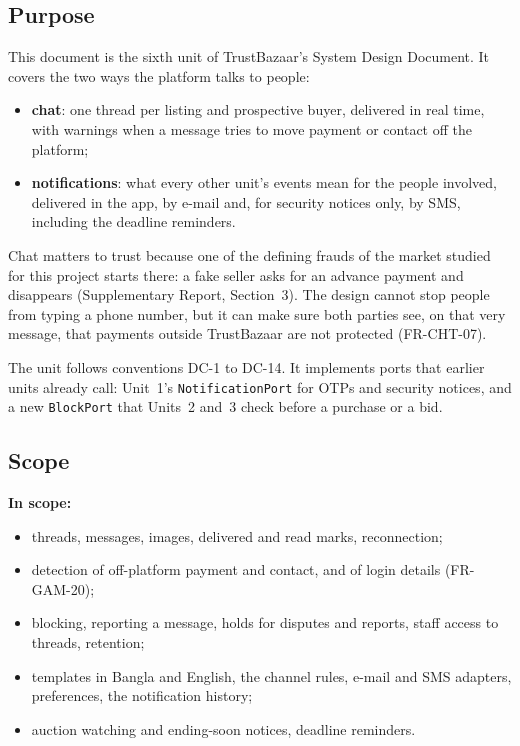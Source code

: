 \documentclass[11pt,a4paper]{article}
\begin{document}
\subsection{Purpose}
This document is the sixth unit of TrustBazaar's System Design Document. It covers the two ways the platform talks to people:
\begin{itemize}[nosep]
  \item \textbf{chat}: one thread per listing and prospective buyer, delivered in real time, with warnings when a message tries to move payment or contact off the platform;
  \item \textbf{notifications}: what every other unit's events mean for the people involved, delivered in the app, by e-mail and, for security notices only, by SMS, including the deadline reminders.
\end{itemize}
Chat matters to trust because one of the defining frauds of the market studied for this project starts there: a fake seller asks for an advance payment and disappears (Supplementary Report, Section~3). The design cannot stop people from typing a phone number, but it can make sure both parties see, on that very message, that payments outside TrustBazaar are not protected (FR-CHT-07).

The unit follows conventions DC-1 to DC-14. It implements ports that earlier units already call: Unit~1's \texttt{NotificationPort} for OTPs and security notices, and a new \texttt{BlockPort} that Units~2 and~3 check before a purchase or a bid.

\subsection{Scope}
\textbf{In scope:}
\begin{itemize}[nosep]
  \item threads, messages, images, delivered and read marks, reconnection;
  \item detection of off-platform payment and contact, and of login details (FR-GAM-20);
  \item blocking, reporting a message, holds for disputes and reports, staff access to threads, retention;
  \item templates in Bangla and English, the channel rules, e-mail and SMS adapters, preferences, the notification history;
  \item auction watching and ending-soon notices, deadline reminders.
\end{itemize}
\end{document}

